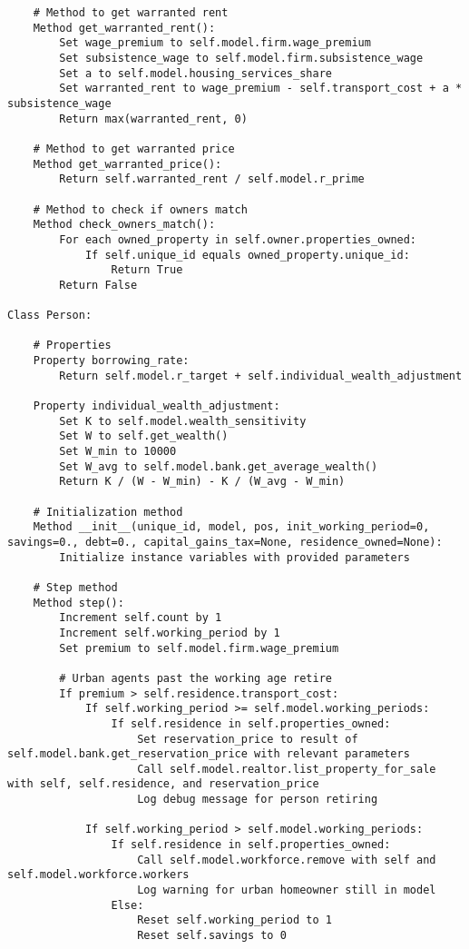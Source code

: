 {\begin{verbatim}
    # Method to get warranted rent
    Method get_warranted_rent():
        Set wage_premium to self.model.firm.wage_premium
        Set subsistence_wage to self.model.firm.subsistence_wage
        Set a to self.model.housing_services_share
        Set warranted_rent to wage_premium - self.transport_cost + a * subsistence_wage
        Return max(warranted_rent, 0)

    # Method to get warranted price
    Method get_warranted_price():
        Return self.warranted_rent / self.model.r_prime

    # Method to check if owners match
    Method check_owners_match():
        For each owned_property in self.owner.properties_owned:
            If self.unique_id equals owned_property.unique_id:
                Return True
        Return False

Class Person:

    # Properties
    Property borrowing_rate:
        Return self.model.r_target + self.individual_wealth_adjustment

    Property individual_wealth_adjustment:
        Set K to self.model.wealth_sensitivity
        Set W to self.get_wealth()
        Set W_min to 10000
        Set W_avg to self.model.bank.get_average_wealth()
        Return K / (W - W_min) - K / (W_avg - W_min)

    # Initialization method
    Method __init__(unique_id, model, pos, init_working_period=0, savings=0., debt=0., capital_gains_tax=None, residence_owned=None):
        Initialize instance variables with provided parameters

    # Step method
    Method step():
        Increment self.count by 1
        Increment self.working_period by 1
        Set premium to self.model.firm.wage_premium

        # Urban agents past the working age retire
        If premium > self.residence.transport_cost:
            If self.working_period >= self.model.working_periods:
                If self.residence in self.properties_owned:
                    Set reservation_price to result of self.model.bank.get_reservation_price with relevant parameters
                    Call self.model.realtor.list_property_for_sale with self, self.residence, and reservation_price
                    Log debug message for person retiring

            If self.working_period > self.model.working_periods:
                If self.residence in self.properties_owned:
                    Call self.model.workforce.remove with self and self.model.workforce.workers
                    Log warning for urban homeowner still in model
                Else:
                    Reset self.working_period to 1
                    Reset self.savings to 0


\end{verbatim}}
